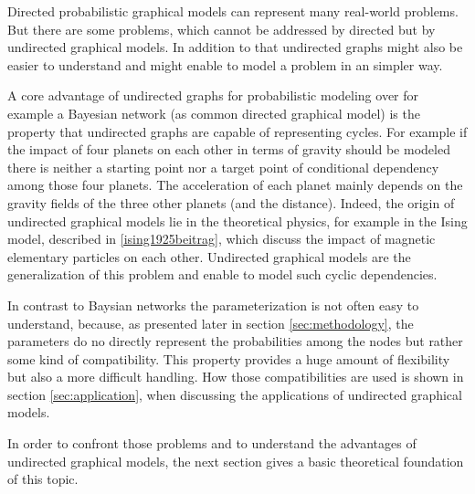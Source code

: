Directed probabilistic graphical models can represent many real-world problems. But there are some problems, which cannot be addressed by directed but by undirected graphical models. In addition to that undirected graphs might also be easier to understand and might enable to model a problem in an simpler way.

A core advantage of undirected graphs for probabilistic modeling over for example a Bayesian network (as common directed graphical model) is the property that undirected graphs are capable of representing cycles. For example if the impact of four planets on each other in terms of gravity should be modeled there is neither a starting point nor a target point of conditional dependency among those four planets. The acceleration of each planet mainly depends on the gravity fields of the three other planets (and the distance). Indeed, the origin of undirected graphical models lie in the theoretical physics, for example in the Ising model, described in \ref{ising1925beitrag}, which discuss the impact of magnetic elementary particles on each other. Undirected graphical models are the generalization of this problem and enable to model such cyclic dependencies.

In contrast to Baysian networks the parameterization is not often easy to understand, because, as presented later in section \ref{sec:methodology}, the parameters do no directly represent the probabilities among the nodes but rather some kind of compatibility. This property provides a huge amount of flexibility but also a more difficult handling. How those compatibilities are used is shown in section \ref{sec:application}, when discussing the applications of undirected graphical models. 

In order to confront those problems and to understand the advantages of undirected graphical models, the next section gives a basic theoretical foundation of this topic.
